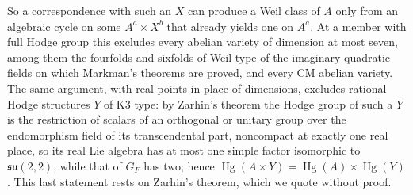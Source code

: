 \documentclass[11pt,reqno]{amsart}
\theoremstyle{plain}
\theoremstyle{definition}
\theoremstyle{remark}
\DeclareMathOperator{\Hg}{Hg}
\begin{document}
So a correspondence with such an $X$ can produce a Weil class of $A$ only from
an algebraic cycle on some $A^{a}\times X^{b}$ that already yields one on
$A^{a}$. At a member with full Hodge group this excludes every abelian
variety of dimension at most seven, among them the fourfolds and sixfolds of
Weil type of the imaginary quadratic fields on which Markman's theorems are
proved, and every CM abelian variety. The same argument, with real points in
place of dimensions, excludes rational Hodge structures $Y$ of K3 type: by
Zarhin's theorem \cite{Zar83} the Hodge group of such a $Y$ is the restriction
of scalars of an orthogonal or unitary group over the endomorphism field of
its transcendental part, noncompact at exactly one real place, so its real Lie
algebra has at most one simple factor isomorphic to $\mathfrak{su}(2,2)$,
while that of $G_{F}$ has two; hence $\Hg(A\times Y)=\Hg(A)\times\Hg(Y)$.
This last statement rests on Zarhin's theorem, which we quote without proof.
\end{document}
